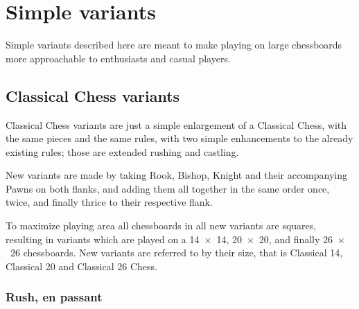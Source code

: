 

\chapter*{Simple variants}
\label{ch:Simple variants}

Simple variants described here are meant to make playing on large chessboards
more approachable to enthusiasts and casual players.


\section*{Classical Chess variants}
\label{sec:Simple variants/Classical Chess variants}

Classical Chess variants are just a simple enlargement of a Classical Chess,
with the same pieces and the same rules, with two simple enhancements to the
already existing rules; those are extended rushing and castling.

New variants are made by taking Rook, Bishop, Knight and their accompanying
Pawns on both flanks, and adding them all together in the same order once,
twice, and finally thrice to their respective flank.

To maximize playing area all chessboards in all new variants are squares,
resulting in variants which are played on a 14~$\times$~14, 20~$\times$~20,
and finally 26~$\times$~26 chessboards.\newline
\indent
New variants are referred to by their size, that is Classical 14, Classical 20
and Classical 26 Chess.

\clearpage %

\subsection*{Rush, en passant}
\label{sec:Simple variants/Classical Chess variants/Rush, en passant}

